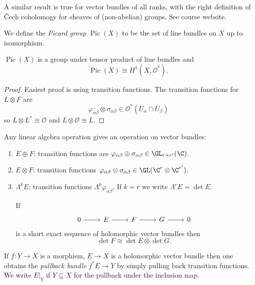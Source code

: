 \documentclass[a4paper]{article}
\DeclareMathOperator{\Pic}{Pic} %
\begin{document}
\begin{remark}
  A similar result is true for vector bundles of all ranks, with the right definition of Čech coholomogy for sheaves of (non-abelian) groups. See course website.
\end{remark}

\begin{definition}
  We define the \emph{Picard group} \(\Pic(X)\) to be the set of line bundles on \(X\) up to isomorphism.
\end{definition}

\begin{proposition}
  \(\Pic(X)\) is a group under tensor product of line bundles and
  \[
    \Pic(X) \cong H^1(X, \mathcal O^*).
  \]
\end{proposition}

\begin{proof}
  Easiest proof is using transition functions. The transition functions for \(L \otimes F\) are
  \[
    \varphi_{\alpha\beta} \otimes \sigma_{\alpha\beta} \in \mathcal O^*(U_\alpha \cap U_\beta)
  \]
  so \(L \otimes L^* \cong \mathcal O\) and \(L \otimes \mathcal O \cong L\).
\end{proof}

\begin{eg}
  Any linear algebra operation gives an operation on vector bundles:
  \begin{enumerate}
  \item \(E \oplus F\): transition functions are \(\varphi_{\alpha\beta} \oplus \sigma_{\alpha\beta} \in \GL_{r + r'}(\C)\).
  \item \(E \otimes F\): transition functions \(\varphi_{\alpha\beta} \otimes \sigma_{\alpha\beta} \in \GL(\C^r \otimes \C^{r'})\).
  \item \(\Lambda^kE\): transition functions \(\Lambda^k \varphi_{\alpha\beta}\). If \(k = r\) we write \(\Lambda^r E = \det E\).

    If
    \[
      \begin{tikzcd}
        0 \ar[r] & E \ar[r] & F \ar[r] & G \ar[r] & 0
      \end{tikzcd}
    \]
    is a short exact sequence of holomorphic vector bundles then
    \[
      \det F \cong \det E \otimes \det G.
    \]
  \end{enumerate}
\end{eg}

\begin{eg}
  If \(f: Y \to X\) is a morphism, \(E \to X\) is a holomorphic vector bundle then one obtains the \emph{pullback bundle} \(f^*E \to Y\) by simply pulling back transition functions. We write \(E|_Y\) if \(Y \subseteq X\) for the pullback under the inclusion map.

\end{eg}
\end{document}
